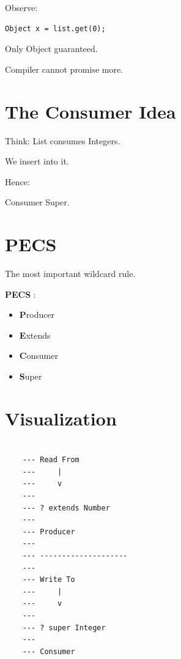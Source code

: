 \documentclass[11pt,a4paper]{book}
\begin{document}
Observe:

\begin{verbatim} 
Object x = list.get(0);
\end{verbatim}

Only Object guaranteed.

Compiler cannot promise more.

\section{The Consumer Idea}

Think:
List consumes Integers.

We insert into it.

Hence:

\begin{rosettarule}

Consumer Super.

\end{rosettarule}

\section{PECS}

The most important wildcard rule.

\textbf{PECS} : 
\begin{itemize}
\item [ ] \textbf{P}roducer
\item [ ] \textbf{E}xtends
\item [ ] \textbf{C}onsumer
\item [ ] \textbf{S}uper
\end{itemize}

\section{Visualization}

\begin{verbatim}

    --- Read From
    ---     |
    ---     v
    --- 
    --- ? extends Number
    --- 
    --- Producer
    --- 
    --- --------------------
    --- 
    --- Write To
    ---     |
    ---     v
    --- 
    --- ? super Integer
    --- 
    --- Consumer

\end{verbatim}
\end{document}
